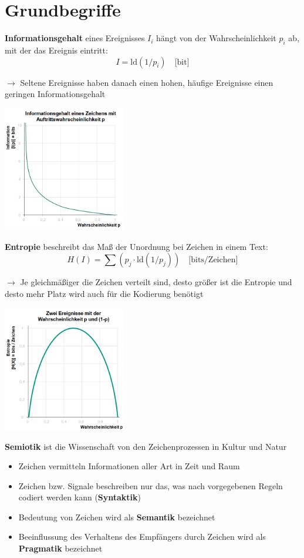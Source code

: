 \section{Grundbegriffe}

\textbf{Informationsgehalt} eines Ereignisses $I_i$ hängt von der Wahrscheinlichkeit $p_i$ ab, mit der das Ereignis eintritt:
$$I = \text{ld}(1/p_i) \quad\text{[bit]}$$

$\rightarrow$ Seltene Ereignisse haben danach einen hohen, häufige Ereignisse einen geringen Informationsgehalt
\begin{center}
	\includegraphics[width=0.4\textwidth]{images/informationsgehalt.png}
\end{center}

\textbf{Entropie} beschreibt das Maß der Unordnung bei Zeichen in einem Text:
$$H(I)=\sum (p_j\cdot\text{ld}(1/p_j))\quad \text{[bits/Zeichen]}$$

$\rightarrow$ Je gleichmäßiger die Zeichen verteilt sind, desto größer ist die Entropie und desto mehr Platz wird auch für die Kodierung benötigt

\begin{center}
	\includegraphics[width=0.4\textwidth]{images/entropie.png}
\end{center}

\textbf{Semiotik} ist die Wissenschaft von den Zeichenprozessen in Kultur und Natur
\begin{itemize}
	\item Zeichen vermitteln Informationen aller Art in Zeit und Raum
	\item Zeichen bzw. Signale beschreiben nur das, was nach vorgegebenen Regeln codiert werden kann (\textbf{Syntaktik})
	\item Bedeutung von Zeichen wird als \textbf{Semantik} bezeichnet
	\item Beeinflussung des Verhaltens des Empfängers durch Zeichen wird als \textbf{Pragmatik} bezeichnet
\end{itemize}

